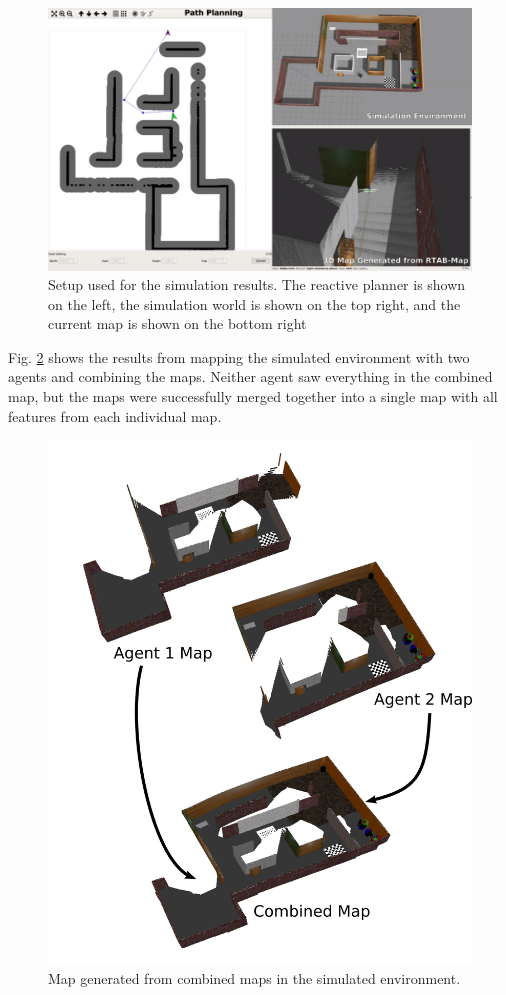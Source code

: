 \documentclass[letterpaper, 10 pt, conference]{ieeeconf}  %
\begin{document}
\begin{figure}
\centering
\includegraphics[width=1.0\linewidth]{sim_setup}
\caption{Setup used for the simulation results. The reactive planner is shown on the left, the simulation world is shown on the top right, and the current map is shown on the bottom right}
\label{fig:sim_setup}
\end{figure}

Fig. \ref{fig:sim_map} shows the results from mapping the simulated environment with two agents and combining the maps. Neither agent saw everything in the combined map, but the maps were successfully merged together into a single map with all features from each individual map.

\begin{figure}
\centering
\includegraphics[width=1.0\linewidth]{sim_map}
\caption{Map generated from combined maps in the simulated environment.}
\label{fig:sim_map}
\end{figure}
\end{document}

